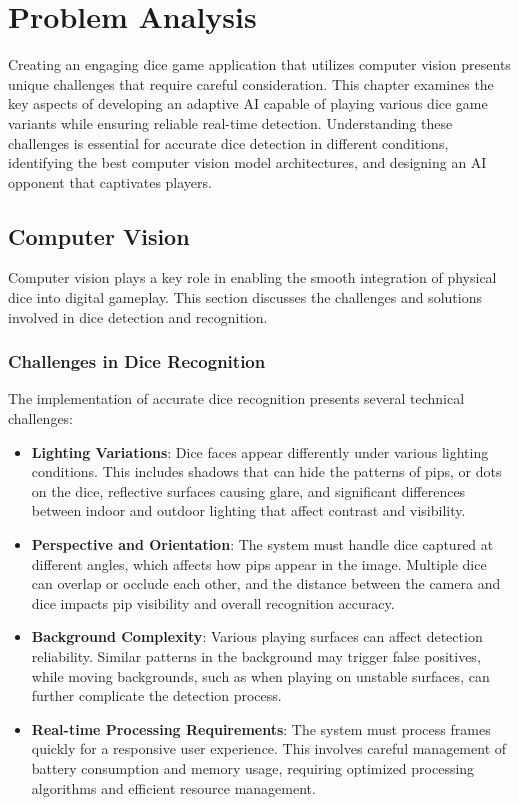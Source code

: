 \chapter{Problem Analysis}

Creating an engaging dice game application that utilizes computer vision presents unique challenges that require careful consideration. This chapter examines the key aspects of developing an adaptive AI capable of playing various dice game variants while ensuring reliable real-time detection. Understanding these challenges is essential for accurate dice detection in different conditions, identifying the best computer vision model architectures, and designing an AI opponent that captivates players.

\section{Computer Vision}

Computer vision plays a key role in enabling the smooth integration of physical dice into digital gameplay. This section discusses the challenges and solutions involved in dice detection and recognition.

\subsection{Challenges in Dice Recognition}

The implementation of accurate dice recognition presents several technical challenges:
\begin{itemize}
    \item \textbf{Lighting Variations}: Dice faces appear differently under various lighting conditions. This includes shadows that can hide the patterns of pips, or dots on the dice, reflective surfaces causing glare, and significant differences between indoor and outdoor lighting that affect contrast and visibility.
    \item \textbf{Perspective and Orientation}: The system must handle dice captured at different angles, which affects how pips appear in the image. Multiple dice can overlap or occlude each other, and the distance between the camera and dice impacts pip visibility and overall recognition accuracy.
    \item \textbf{Background Complexity}: Various playing surfaces can affect detection reliability. Similar patterns in the background may trigger false positives, while moving backgrounds, such as when playing on unstable surfaces, can further complicate the detection process.
    \item \textbf{Real-time Processing Requirements}: The system must process frames quickly for a responsive user experience. This involves careful management of battery consumption and memory usage, requiring optimized processing algorithms and efficient resource management.
\end{itemize}

